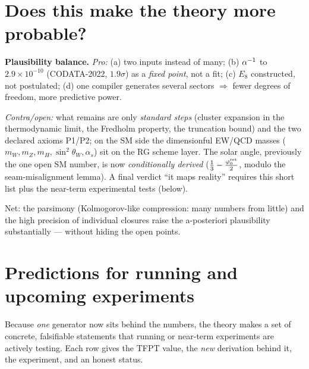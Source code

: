 \section{Does this make the theory more probable?}
\noindent\textbf{Plausibility balance.}
\emph{Pro:} (a) two inputs instead of many; (b) $\alpha^{-1}$ to $2.9\times10^{-10}$ (CODATA-2022, $1.9\sigma$) as a \emph{fixed point},
not a fit; (c) $E_8$ constructed, not postulated; (d) one compiler generates several sectors $\Rightarrow$
fewer degrees of freedom, more predictive power.
\par\smallskip
\noindent\emph{Contra/open:} what remains are only \emph{standard steps} (cluster expansion in the thermodynamic
limit, the Fredholm property, the truncation bound) and the two declared axioms P1/P2; on the SM side the
dimensionful EW/QCD masses ($m_W,m_Z,m_H,\sin^2\theta_W,\alpha_s$) sit on the RG scheme layer. The solar
angle, previously the one open SM number, is now \emph{conditionally derived} ($\tfrac13-\tfrac{\varphi_0^{\mathrm{ret}}}{2}$,
modulo the seam-misalignment lemma). A final
verdict ``it maps reality'' requires this short list plus the near-term experimental tests (below).

Net: the parsimony (Kolmogorov-like compression: many numbers from little) and the high precision of
individual closures raise the a-posteriori plausibility substantially --- without hiding the open points.

\section{Predictions for running and upcoming experiments}
Because \emph{one} generator now sits behind the numbers, the theory makes a set of concrete, falsifiable
statements that running or near-term experiments are actively testing. Each row gives the TFPT value,
the \emph{new} derivation behind it, the experiment, and an honest status.



